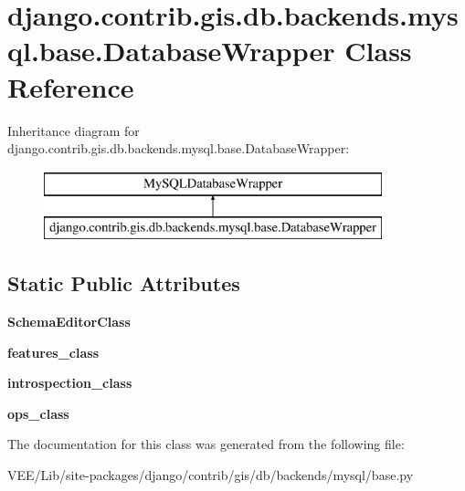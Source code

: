 \hypertarget{classdjango_1_1contrib_1_1gis_1_1db_1_1backends_1_1mysql_1_1base_1_1_database_wrapper}{}\section{django.\+contrib.\+gis.\+db.\+backends.\+mysql.\+base.\+Database\+Wrapper Class Reference}
\label{classdjango_1_1contrib_1_1gis_1_1db_1_1backends_1_1mysql_1_1base_1_1_database_wrapper}
Inheritance diagram for django.\+contrib.\+gis.\+db.\+backends.\+mysql.\+base.\+Database\+Wrapper\+:\begin{figure}[H]
\begin{center}
\leavevmode
\includegraphics[height=2.000000cm]{classdjango_1_1contrib_1_1gis_1_1db_1_1backends_1_1mysql_1_1base_1_1_database_wrapper}
\end{center}
\end{figure}
\subsection*{Static Public Attributes}
\begin{DoxyCompactItemize}
\item 
\mbox{\label{classdjango_1_1contrib_1_1gis_1_1db_1_1backends_1_1mysql_1_1base_1_1_database_wrapper_a445eb4d4d6d658625b12bcae14b0605e}} 
{\bfseries Schema\+Editor\+Class}
\item 
\mbox{\label{classdjango_1_1contrib_1_1gis_1_1db_1_1backends_1_1mysql_1_1base_1_1_database_wrapper_a5f3d5193f801671f146aed61392fe724}} 
{\bfseries features\+\_\+class}
\item 
\mbox{\label{classdjango_1_1contrib_1_1gis_1_1db_1_1backends_1_1mysql_1_1base_1_1_database_wrapper_a5ceddfbaf5230628d6ab65120471405c}} 
{\bfseries introspection\+\_\+class}
\item 
\mbox{\label{classdjango_1_1contrib_1_1gis_1_1db_1_1backends_1_1mysql_1_1base_1_1_database_wrapper_ad977bceac297b70f61590317256c81a8}} 
{\bfseries ops\+\_\+class}
\end{DoxyCompactItemize}


The documentation for this class was generated from the following file\+:\begin{DoxyCompactItemize}
\item 
V\+E\+E/\+Lib/site-\/packages/django/contrib/gis/db/backends/mysql/base.\+py\end{DoxyCompactItemize}
